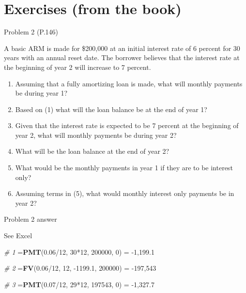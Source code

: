 \documentclass[ignorenonframetext,]{beamer}
\newenvironment{Shaded}{\begin{snugshade}}{\end{snugshade}}
\newcommand{\KeywordTok}[1]{\textcolor[rgb]{0.13,0.29,0.53}{\textbf{{#1}}}}
\newcommand{\DecValTok}[1]{\textcolor[rgb]{0.00,0.00,0.81}{{#1}}}
\newcommand{\FloatTok}[1]{\textcolor[rgb]{0.00,0.00,0.81}{{#1}}}
\newcommand{\StringTok}[1]{\textcolor[rgb]{0.31,0.60,0.02}{{#1}}}
\newcommand{\CommentTok}[1]{\textcolor[rgb]{0.56,0.35,0.01}{\textit{{#1}}}}
\newcommand{\NormalTok}[1]{{#1}}
\providecommand{\tightlist}{%
\setlength{\itemsep}{0pt}\setlength{\parskip}{0pt}}
\begin{document}
\section{Exercises (from the book)}\label{exercises-from-the-book}

\begin{frame}{Problem 2 (P.146)}

\small

A basic ARM is made for \$200,000 at an initial interest rate of 6
percent for 30 years with an annual reset date. The borrower believes
that the interest rate at the beginning of year 2 will increase to 7
percent.

\begin{enumerate}
\def\labelenumi{\arabic{enumi}.}
\tightlist
\item
  Assuming that a fully amortizing loan is made, what will monthly
  payments be during year 1?
\item
  Based on (1) what will the loan balance be at the end of year 1?
\item
  Given that the interest rate is expected to be 7 percent at the
  beginning of year 2, what will monthly payments be during year 2?
\item
  What will be the loan balance at the end of year 2?
\item
  What would be the monthly payments in year 1 if they are to be
  interest only?
\item
  Assuming terms in (5), what would monthly interest only payments be in
  year 2?
\end{enumerate}

\end{frame}

\begin{frame}[fragile]{Problem 2 answer}

\begin{Shaded}
\begin{Highlighting}[]
\NormalTok{See Excel}

\CommentTok{# 1}
\NormalTok{=}\KeywordTok{PMT}\NormalTok{(}\FloatTok{0.06}\NormalTok{/}\DecValTok{12}\NormalTok{, }\DecValTok{30}\NormalTok{*}\DecValTok{12}\NormalTok{, }\DecValTok{200000}\NormalTok{, }\DecValTok{0}\NormalTok{) =}\StringTok{ }\NormalTok{-}\DecValTok{1}\NormalTok{,}\FloatTok{199.1}

\CommentTok{# 2}
\NormalTok{=}\KeywordTok{FV}\NormalTok{(}\FloatTok{0.06}\NormalTok{/}\DecValTok{12}\NormalTok{, }\DecValTok{12}\NormalTok{, -}\FloatTok{1199.1}\NormalTok{, }\DecValTok{200000}\NormalTok{) =}\StringTok{ }\NormalTok{-}\DecValTok{197}\NormalTok{,}\DecValTok{543}

\CommentTok{# 3}
\NormalTok{=}\KeywordTok{PMT}\NormalTok{(}\FloatTok{0.07}\NormalTok{/}\DecValTok{12}\NormalTok{, }\DecValTok{29}\NormalTok{*}\DecValTok{12}\NormalTok{, }\DecValTok{197543}\NormalTok{, }\DecValTok{0}\NormalTok{) =}\StringTok{ }\NormalTok{-}\DecValTok{1}\NormalTok{,}\FloatTok{327.7}
\end{Highlighting}
\end{Shaded}

\end{frame}
\end{document}
